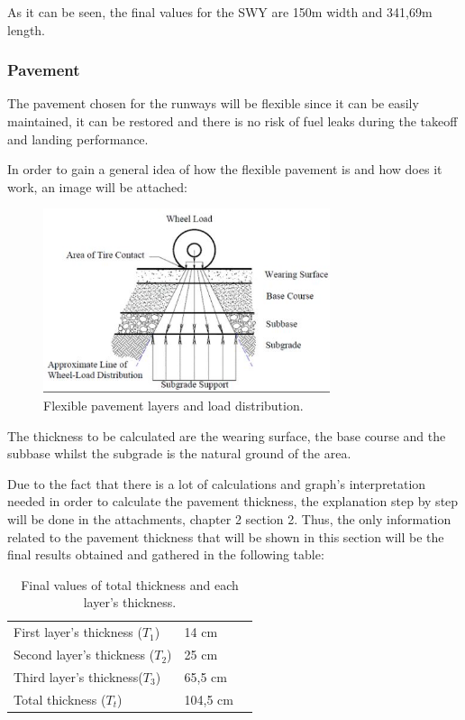 			As it can be seen, the final values for the SWY are 150m width and 341,69m length.
			
			\subsubsection{Pavement}
			The pavement chosen for the runways will be flexible since it can be easily maintained, it can be restored and there is no risk of fuel leaks during the takeoff and landing performance.
			
			In order to gain a general idea of how the flexible pavement is and how does it work, an image will be attached:
			
			\begin{figure}[H]
				\centering
				\includegraphics[clip, trim=0cm 0.1cm 0cm 0cm, width=0.75\textwidth]{./images/pavement/flexiblepavement}
				\caption{Flexible pavement layers and load distribution.} %
				\label{} %
			\end{figure}
			
			The thickness to be calculated are the wearing surface, the base course and the subbase whilst the subgrade is the natural ground of the area. 
			
			Due to the fact that there is a lot of calculations and graph's interpretation needed in order to calculate the pavement thickness, the explanation step by step will be done in the attachments, chapter 2 section 2. Thus, the only information related to the pavement thickness that will be shown in this section will be the final results obtained and gathered in the following table:
			
			\begin{table}[htb]
				\centering
				\begin{tabular}{ll p{5cm}}
					\midrule[2pt]
					First layer's thickness (\(T_1\))& 14 cm\\
					Second layer's thickness (\(T_2\)) & 25 cm\\
					Third layer's thickness(\(T_3\))& 65,5 cm \\
					Total thickness (\(T_t\))& 104,5 cm\\
					\bottomrule[2pt]
				\end{tabular}
				\caption{Final values of total thickness and each layer's thickness.}
				\label{}
			\end{table}

